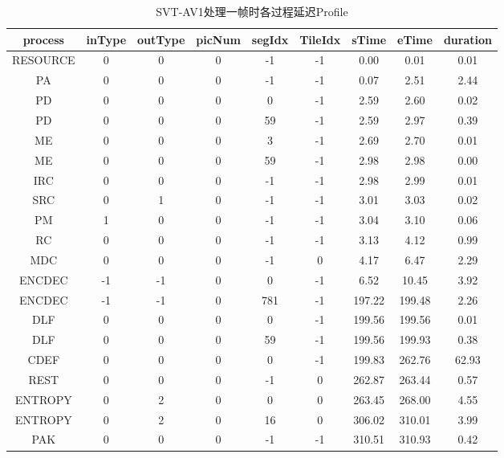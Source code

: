   \begin{table}[!hpt]
    \renewcommand{\arraystretch}{0.8} %
    \caption{SVT-AV1处理一帧时各过程延迟Profile}
    \label{tab:svt-profile}
    \centering
    \begin{tabular}{ccccccccc}
    	\toprule
    	process  & inType & outType & picNum & segIdx & TileIdx & sTime  & eTime  & duration \\ \midrule
    	RESOURCE &   0    &    0    &   0    &   -1   &   -1    &  0.00  &  0.01  &   0.01   \\
    	   PA    &   0    &    0    &   0    &   -1   &   -1    &  0.07  &  2.51  &   2.44   \\
    	   PD    &   0    &    0    &   0    &   0    &   -1    &  2.59  &  2.60  &   0.02   \\
    	   PD    &   0    &    0    &   0    &   59   &   -1    &  2.59  &  2.97  &   0.39   \\
    	   ME    &   0    &    0    &   0    &   3    &   -1    &  2.69  &  2.70  &   0.01   \\
    	   ME    &   0    &    0    &   0    &   59   &   -1    &  2.98  &  2.98  &   0.00   \\
    	  IRC    &   0    &    0    &   0    &   -1   &   -1    &  2.98  &  2.99  &   0.01   \\
    	  SRC    &   0    &    1    &   0    &   -1   &   -1    &  3.01  &  3.03  &   0.02   \\
    	   PM    &   1    &    0    &   0    &   -1   &   -1    &  3.04  &  3.10  &   0.06   \\
    	   RC    &   0    &    0    &   0    &   -1   &   -1    &  3.13  &  4.12  &   0.99   \\
    	  MDC    &   0    &    0    &   0    &   -1   &    0    &  4.17  &  6.47  &   2.29   \\
    	 ENCDEC  &   -1   &   -1    &   0    &   0    &   -1    &  6.52  & 10.45  &   3.92   \\
    	 ENCDEC  &   -1   &   -1    &   0    &  781   &   -1    & 197.22 & 199.48 &   2.26   \\
    	  DLF    &   0    &    0    &   0    &   0    &   -1    & 199.56 & 199.56 &   0.01   \\
    	  DLF    &   0    &    0    &   0    &   59   &   -1    & 199.56 & 199.93 &   0.38   \\
    	  CDEF   &   0    &    0    &   0    &   0    &   -1    & 199.83 & 262.76 &  62.93   \\
    	  REST   &   0    &    0    &   0    &   -1   &    0    & 262.87 & 263.44 &   0.57   \\
    	ENTROPY  &   0    &    2    &   0    &   0    &    0    & 263.45 & 268.00 &   4.55   \\
    	ENTROPY  &   0    &    2    &   0    &   16   &    0    & 306.02 & 310.01 &   3.99   \\
    	  PAK    &   0    &    0    &   0    &   -1   &   -1    & 310.51 & 310.93 &   0.42   \\ \bottomrule
    \end{tabular}
  \end{table}


